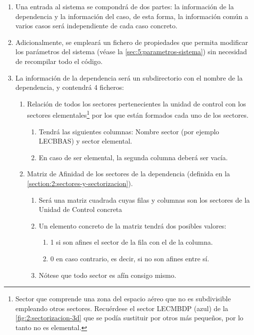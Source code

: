 \begin{enumerate}[label={\textbf{RIO\arabic*}}, ref={Requisito RIO\arabic*},  align=left]
	
	\item  Una entrada al sistema se compondrá de dos partes: la información de la dependencia y la información del caso, de esta forma, la información común a varios casos será independiente de cada caso concreto.
	
	\item Adicionalmente, se empleará un fichero de propiedades que permita modificar los parámetros del sistema (véase la \autoref{sec:5:parametros-sistema}) sin necesidad de recompilar todo el código.	
	
	\item La información de la dependencia será un subdirectorio con el nombre de la dependencia, y contendrá 4 ficheros:
	\begin{enumerate}[label*={\textbf{.\arabic*}}]
		\item  Relación de todos los sectores pertenecientes la unidad de control con los sectores elementales\footnote{
			Sector que comprende una zona del espacio aéreo que no es subdivisible empleando otros sectores. Recuérdese el sector LECMBDP (azul) de la \autoref{fig:2:sectorizacion-3d} que se podía sustituir por otros más pequeños, por lo tanto no es elemental.
		} por los que están formados cada uno de los sectores.
		\begin{enumerate}[label*={\textbf{.\arabic*}}]
			\item Tendrá las siguientes columnas: Nombre sector (por ejemplo LECBBAS) y sector elemental.
			\item En caso de ser elemental, la segunda columna deberá ser vacía.
		\end{enumerate}
		
		\item  Matriz de Afinidad de los sectores de la dependencia (definida en la \autoref{section:2:sectores-y-sectorizacion}).
		\begin{enumerate}[label*={\textbf{.\arabic*}}]
			\item Será una matriz cuadrada cuyas filas y columnas son los sectores de la Unidad de Control concreta
			\item Un elemento concreto de la matriz tendrá dos posibles valores:
			\begin{enumerate}[label*={\textbf{.\arabic*}}]
				\item 1 si son afines el sector de la fila con el de la columna.
				\item 0 en caso contrario, es decir, si no son afines entre sí.
			\end{enumerate}
			\item Nótese que todo sector es afín consigo mismo.
		\end{enumerate}
		

\end{enumerate}
\end{enumerate}
